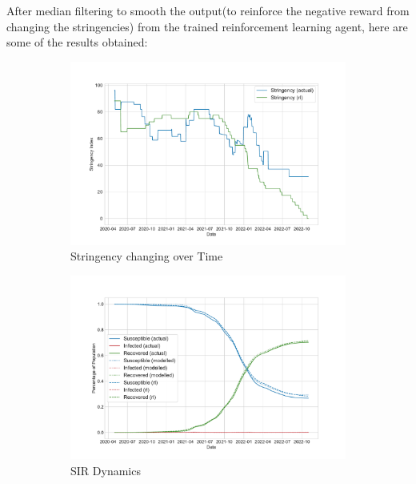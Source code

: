 \documentclass[tikz,fleqn,12pt]{wlscirep}
\begin{document}
After median filtering to smooth the output(to reinforce the negative reward from changing the stringencies) from the trained reinforcement learning agent, here are some of the results obtained:
\begin{figure}[htbp!]
  \centering
  \begin{subfigure}[t]{0.48\textwidth}
    \centering
    \includegraphics[width=\linewidth]{images/176647/rl_stringency.pdf}
    \caption{Stringency changing over Time}
  \end{subfigure}
  \label{fig:176647_rl_stringency}
  \hfill
  \begin{subfigure}[t]{0.48\textwidth}
    \centering
    \includegraphics[width=\linewidth]{images/176647/rl_sir.pdf}
    \caption{SIR Dynamics}
  \end{subfigure}
  \label{fig:176647_rl_sir}
  \hfill
  \begin{subfigure}[t]{0.48\textwidth}

\end{subfigure}
\end{figure}
\end{document}
